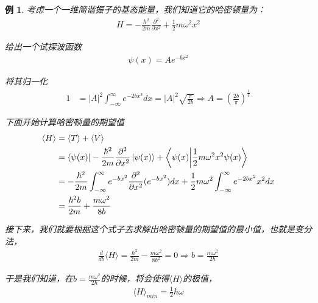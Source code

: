\documentclass{article}
\newtheorem{example}{例}
\newcommand{\expectation}[1]{\langle #1 \rangle}
\begin{document}
\begin{example}
    考虑一个一维简谐振子的基态能量，我们知道它的哈密顿量为：
    \begin{align*}
        H=-\frac{\hbar^2}{2m}\frac{\partial^2}{\partial x^2}+\frac{1}{2}m\omega^2x^2
    \end{align*}

    给出一个试探波函数
    \begin{align*}
        \psi(x)=Ae^{-bx^2}
    \end{align*}

    将其归一化
    \begin{align*}
        1&=|A|^2\int_{-\infty}^{\infty}e^{-2bx^2}dx=|A|^2\sqrt{\frac{\pi}{2b}}\Rightarrow A=\left(\frac{2b}{\pi}\right)^{\frac{1}{4}}
    \end{align*}

    下面开始计算哈密顿量的期望值
    \begin{align*}
        \expectation{H}&=\expectation{T}+\expectation{V}\\
        &=\bra{\psi(x)}-\frac{\hbar^2}{2m}\frac{\partial^2}{\partial x^2}\ket{\psi(x)}+\braket{\psi(x)}{\frac{1}{2}m\omega^2x^2\psi(x)}\\
        &=-\frac{\hbar^2}{2m}\int_{-\infty}^{\infty}e^{-bx^2}\frac{\partial^2}{\partial x^2}(e^{-bx^2})dx+\frac{1}{2}m\omega^2\int_{-\infty}^{\infty}e^{-2bx^2}x^2dx\\
        &=\frac{\hbar^2b}{2m}+\frac{m\omega^2}{8b}
    \end{align*}

    接下来，我们就要根据这个式子去求解出哈密顿量的期望值的最小值，也就是变分法，
    \begin{align*}
        \frac{d}{db}\expectation{H}=\frac{\hbar^2}{2m}-\frac{m\omega^2}{8b^2}=0\Rightarrow b=\frac{m\omega^2}{2\hbar}
    \end{align*}

    于是我们知道，在$\displaystyle b=\frac{m\omega^2}{2\hbar}$的时候，将会使得$\expectation{H}$的极值，
    \begin{align*}
        \expectation{H}_{min}=\frac{1}{2}\hbar\omega
    \end{align*}
\end{example}
\end{document}

